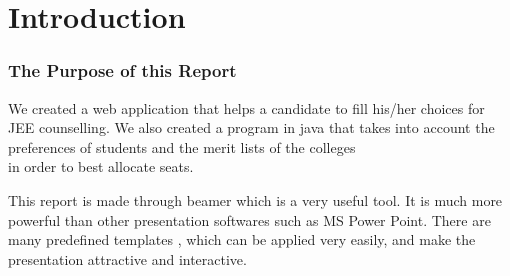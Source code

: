 \section{Introduction}
\begin{frame}
	\frametitle{The Purpose of this Report}
	We created a web application that helps a candidate to fill his/her choices for JEE counselling. \pause 
	We also created a program in java that takes into account the preferences of students and the merit lists of the colleges \\
	in order to best allocate seats. \pause
	
	This report is made through beamer which is a very useful tool. It is much more powerful than other presentation softwares such as MS Power Point. \pause
	There are many predefined templates , which can be applied very easily, and make the presentation attractive and interactive.\pause
	
	
	
\end{frame}
